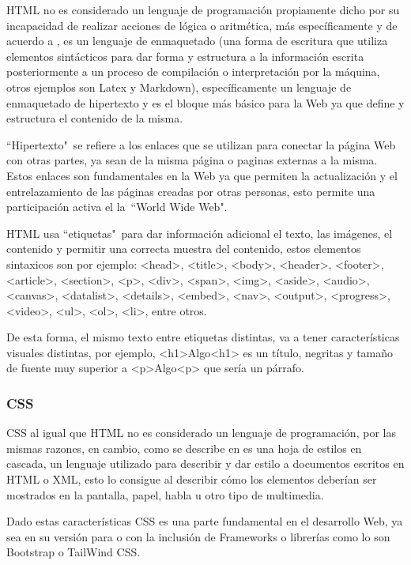 HTML no es considerado un lenguaje de programación propiamente dicho por su
incapacidad de realizar acciones de lógica o aritmética, más específicamente y
de acuerdo a \textcite{HTML},
es un lenguaje de enmaquetado (una forma de escritura que utiliza elementos
sintácticos para dar forma y estructura a la información escrita posteriormente
a un proceso de  compilación o interpretación por la máquina, otros ejemplos son
Latex y Markdown), específicamente un lenguaje de enmaquetado de hipertexto y es
el bloque más básico para la Web ya que define y estructura el contenido de la
misma.

``Hipertexto"\  se refiere a los enlaces que se utilizan para conectar la página
Web con otras partes, ya sean de la misma página o paginas externas a la misma.
Estos enlaces son fundamentales en la Web ya que permiten la actualización y el
entrelazamiento de las páginas creadas por otras personas, esto permite
una participación activa el la\  ``World Wide Web".

HTML usa ``etiquetas"\  para dar información adicional  el texto, las imágenes,
el contenido y permitir
una correcta muestra del contenido, estos elementos sintaxicos son por ejemplo:
 <head>, <title>, <body>, <header>, <footer>, <article>, <section>, <p>, <div>,
 <span>, <img>, <aside>, <audio>, <canvas>, <datalist>, <details>, <embed>,
 <nav>, <output>, <progress>, <video>, <ul>, <ol>, <li>, entre otros.

 De esta forma, el mismo texto entre etiquetas distintas, va a tener características
 visuales distintas, por ejemplo, <h1>Algo<h1> es un título, negritas y tamaño de
 fuente muy superior a <p>Algo<p> que sería un párrafo.


\subsubsection{CSS}

CSS al igual que HTML no es considerado un lenguaje de programación, por las mismas
razones, en cambio, como se describe en \textcite{CSS} es una hoja de estilos en cascada,
un lenguaje utilizado para describir y dar estilo a documentos escritos en HTML o
XML, esto lo consigue al describir cómo los elementos deberían ser mostrados en la
pantalla, papel, habla u otro tipo de multimedia.

Dado estas características CSS es una parte fundamental en el desarrollo Web, ya
sea en su versión para o con la inclusión de Frameworks o librerías como lo son
Bootstrap o TailWind CSS.


